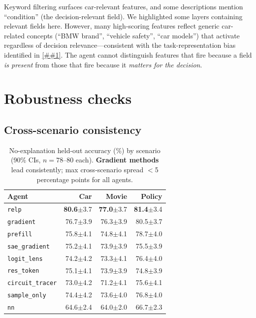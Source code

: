 \documentclass{article} %
\newcommand{\Cref}[1]{\ref{##1}}
\begin{document}
\noindent Keyword filtering surfaces car-relevant features, and some descriptions mention ``condition'' (the decision-relevant field). We highlighted some layers containing relevant fields here. However, many high-scoring features reflect generic car-related concepts (``BMW brand'', ``vehicle safety'', ``car models'') that activate regardless of decision relevance---consistent with the task-representation bias identified in \Cref{sec:mechanistic}. The agent cannot distinguish features that fire because a field \emph{is present} from those that fire because it \emph{matters for the decision}.

\section{Robustness checks}
\label{app:format}
\subsection{Cross-scenario consistency}
\begin{table}[h]
\small
\begin{center}
\renewcommand{\arraystretch}{1.1}
\begin{tabular}{@{}l rrr@{}}
\toprule
\textbf{Agent} & \textbf{Car} & \textbf{Movie} & \textbf{Policy} \\
\midrule
\rowcolor{gradrow}
\texttt{relp} & \textbf{80.6}{\scriptsize$\pm$3.7} & \textbf{77.0}{\scriptsize$\pm$3.7} & \textbf{81.4}{\scriptsize$\pm$3.4} \\
\rowcolor{gradrow}
\texttt{gradient} & 76.7{\scriptsize$\pm$3.9} & 76.3{\scriptsize$\pm$3.9} & 80.5{\scriptsize$\pm$3.7} \\[2pt]
\texttt{prefill} & 75.8{\scriptsize$\pm$4.1} & 74.8{\scriptsize$\pm$4.1} & 78.7{\scriptsize$\pm$4.0} \\
\texttt{sae\_gradient} & 75.2{\scriptsize$\pm$4.1} & 73.9{\scriptsize$\pm$3.9} & 75.5{\scriptsize$\pm$3.9} \\
\texttt{logit\_lens} & 74.2{\scriptsize$\pm$4.2} & 73.3{\scriptsize$\pm$4.1} & 76.4{\scriptsize$\pm$4.0} \\
\texttt{res\_token} & 75.1{\scriptsize$\pm$4.1} & 73.9{\scriptsize$\pm$3.9} & 74.8{\scriptsize$\pm$3.9} \\
\texttt{circuit\_tracer} & 73.0{\scriptsize$\pm$4.2} & 71.2{\scriptsize$\pm$4.1} & 75.6{\scriptsize$\pm$4.1} \\
\texttt{sample\_only} & 74.4{\scriptsize$\pm$4.2} & 73.6{\scriptsize$\pm$4.0} & 76.8{\scriptsize$\pm$4.0} \\[2pt]
\texttt{nn} & 64.6{\scriptsize$\pm$2.4} & 64.0{\scriptsize$\pm$2.0} & 66.7{\scriptsize$\pm$2.3} \\
\bottomrule
\end{tabular}
\renewcommand{\arraystretch}{1.0}
\end{center}
\caption{No-explanation held-out accuracy (\%) by scenario (90\% CIs, $n{=}78$--$80$ each). {\setlength{\fboxsep}{1pt}\colorbox{gradrow}{\textbf{Gradient methods}}} lead consistently; max cross-scenario spread $<$5 percentage points for all agents.}
\label{tab:cross_scenario}
\end{table}
\end{document}
